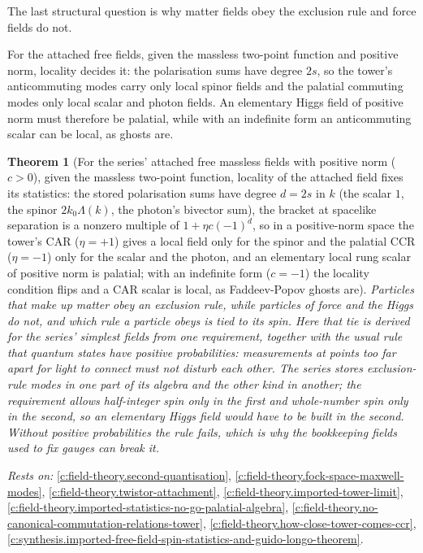 \documentclass[11pt]{article}
\newtheorem{theorem}{Theorem}[section]
\theoremstyle{definition}
\theoremstyle{plain}
\begin{document}
The last structural question is why matter fields obey the exclusion rule and force fields do not.

For the attached free fields, given the massless two-point function and positive norm, locality decides it: the polarisation sums have degree $2s$, so the tower's anticommuting modes carry only local spinor fields and the palatial commuting modes only local scalar and photon fields. An elementary Higgs field of positive norm must therefore be palatial, while with an indefinite form an anticommuting scalar can be local, as ghosts are.

\begin{theorem}[For the series' attached free massless fields with positive norm ($c > 0$), given the massless two-point function, locality of the attached field fixes its statistics: the stored polarisation sums have degree $d = 2s$ in $k$ (the scalar $1$, the spinor $2k_{0}\Lambda(k)$, the photon's bivector sum), the bracket at spacelike separation is a nonzero multiple of $1 + \eta c(-1)^{d}$, so in a positive-norm space the tower's CAR ($\eta = +1$) gives a local field only for the spinor and the palatial CCR ($\eta = -1$) only for the scalar and the photon, and an elementary local rung scalar of positive norm is palatial; with an indefinite form ($c = -1$) the locality condition flips and a CAR scalar is local, as Faddeev-Popov ghosts are]\label{c:synthesis.locality-of-the-attached-free-fields-fixes-their-statistics}
Particles that make up matter obey an exclusion rule, while particles of force and the Higgs do not, and which rule a particle obeys is tied to its spin. Here that tie is derived for the series' simplest fields from one requirement, together with the usual rule that quantum states have positive probabilities: measurements at points too far apart for light to connect must not disturb each other. The series stores exclusion-rule modes in one part of its algebra and the other kind in another; the requirement allows half-integer spin only in the first and whole-number spin only in the second, so an elementary Higgs field would have to be built in the second. Without positive probabilities the rule fails, which is why the bookkeeping fields used to fix gauges can break it.
\end{theorem}
\noindent\emph{Rests on:} \ref{c:field-theory.second-quantisation}, \ref{c:field-theory.fock-space-maxwell-modes}, \ref{c:field-theory.twistor-attachment}, \ref{c:field-theory.imported-tower-limit}, \ref{c:field-theory.imported-statistics-no-go-palatial-algebra}, \ref{c:field-theory.no-canonical-commutation-relations-tower}, \ref{c:field-theory.how-close-tower-comes-ccr}, \ref{c:synthesis.imported-free-field-spin-statistics-and-guido-longo-theorem}.
\end{document}
